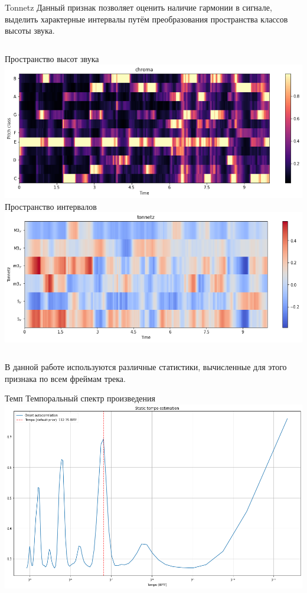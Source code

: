 \documentclass[c, aspectratio = 43]{beamer}
\begin{document}
\begin{frame}{Tonnetz}
Данный признак позволяет оценить наличие гармонии в сигнале, выделить характерные интервалы путём преобразования пространства классов высоты звука.\\
\vspace{1cm}

\begin{columns}
    Пространство высот звука
    \includegraphics[width=\linewidth]{chroma.png}
    Пространство интервалов
    \includegraphics[width=\linewidth]{tonnetz.png}
\end{columns}
\vspace{1cm}
В данной работе используются различные статистики, вычисленные для этого признака по всем фреймам трека.
\end{frame}

\begin{frame}{Темп}
Темпоральный спектр произведения\\
\vspace{1cm}
\includegraphics[width=\linewidth]{tempo.png}
\end{frame}
\end{document}
